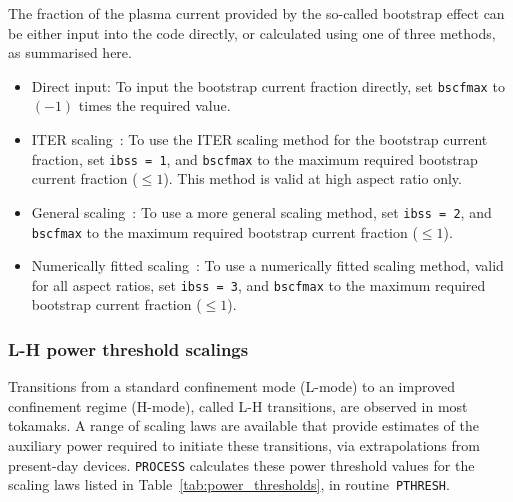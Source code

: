 \documentclass[11pt,a4paper]{report}
\newcommand{\process}{\mbox{\texttt{PROCESS}}}
\begin{document}
The fraction of the plasma current provided by the so-called bootstrap effect
can be either input into the code directly, or calculated using one of three
methods, as summarised here.

\begin{itemize}

\item Direct input: To input the bootstrap current fraction directly, set
  \texttt{bscfmax} to $(-1)$ times the required value.

\item ITER scaling~\cite{IPDG}: To use the ITER scaling method for the
  bootstrap current fraction, set \texttt{ibss = 1}, and \texttt{bscfmax} to
  the maximum required bootstrap current fraction ($\leq 1$). This method is
  valid at high aspect ratio only.

\item General scaling~\cite{Nevins}: To use a more general scaling method, set
  \texttt{ibss = 2}, and \texttt{bscfmax} to the maximum required bootstrap
  current fraction ($\leq 1$).

\item Numerically fitted scaling~\cite{WilsonBS}: To use a numerically fitted
  scaling method, valid for all aspect ratios, set \texttt{ibss = 3}, and
  \texttt{bscfmax} to the maximum required bootstrap current fraction ($\leq
  1$).

\end{itemize}

\subsubsection{L-H power threshold scalings}

Transitions from a standard confinement mode (L-mode) to an improved
confinement regime (H-mode), called L-H transitions, are observed in most
tokamaks. A range of scaling laws are available that provide estimates of the
auxiliary power required to initiate these transitions, via extrapolations
from present-day devices. \process\/ calculates these power threshold values
for the scaling laws listed in Table~\ref{tab:power_thresholds}, in
routine~\texttt{PTHRESH}.

\end{document}
